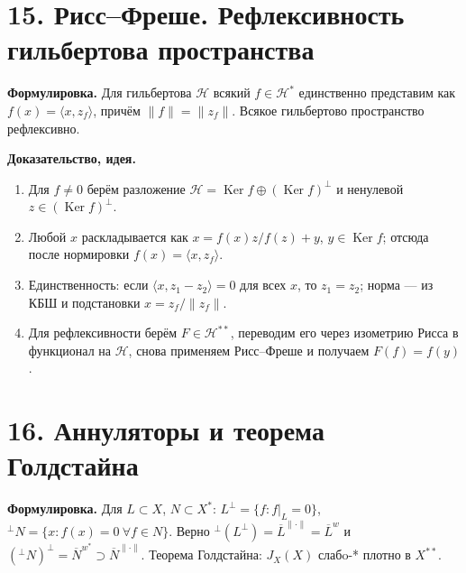 \documentclass[10pt,a4paper]{article}
\newcommand{\X}{X}
\newcommand{\Ker}{\operatorname{Ker}}
\begin{document}
	\section*{15. Рисс--Фреше. Рефлексивность гильбертова пространства}
	\textbf{Формулировка.} Для гильбертова $\mathcal H$ всякий $f\in\mathcal H^\ast$ единственно представим как $f(x)=\langle x,z_f\rangle$, причём $\|f\|=\|z_f\|$. Всякое гильбертово пространство рефлексивно.

	\textbf{Доказательство, идея.}
	\begin{enumerate}
		\item Для $f\ne0$ берём разложение $\mathcal H=\Ker f\oplus(\Ker f)^\perp$ и ненулевой $z\in(\Ker f)^\perp$.
		\item Любой $x$ раскладывается как $x=f(x)z/f(z)+y$, $y\in\Ker f$; отсюда после нормировки $f(x)=\langle x,z_f\rangle$.
		\item Единственность: если $\langle x,z_1-z_2\rangle=0$ для всех $x$, то $z_1=z_2$; норма --- из КБШ и подстановки $x=z_f/\|z_f\|$.
		\item Для рефлексивности берём $F\in\mathcal H^{\ast\ast}$, переводим его через изометрию Рисса в функционал на $\mathcal H$, снова применяем Рисс--Фреше и получаем $F(f)=f(y)$.
	\end{enumerate}

	\section*{16. Аннуляторы и теорема Голдстайна}
	\textbf{Формулировка.} Для $L\subset\X$, $N\subset\X^\ast$: $L^\perp=\{f:f|_L=0\}$, ${}^\perp N=\{x:f(x)=0\ \forall f\in N\}$. Верно ${}^\perp(L^\perp)=\overline L^{\|\cdot\|}=\overline L^w$ и $({}^\perp N)^\perp=\overline N^{w^\ast}\supset\overline N^{\|\cdot\|}$. Теорема Голдстайна: $J_\X(\X)$ слабo-* плотно в $\X^{\ast\ast}$.
\end{document}
